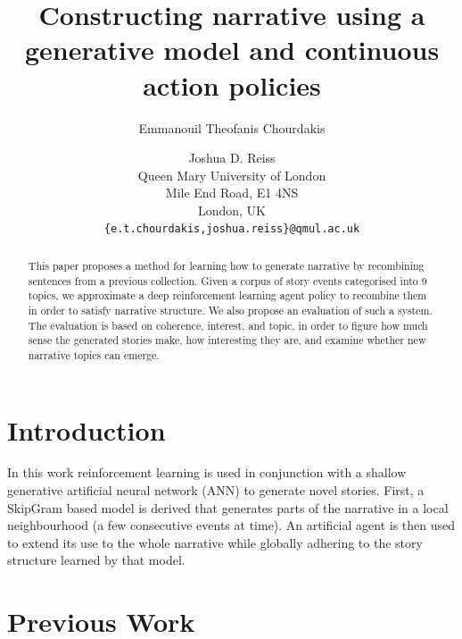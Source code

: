 \documentclass[11pt,letterpaper]{article}
\title{Constructing narrative using a generative model and continuous action policies}
\author{Emmanouil Theofanis Chourdakis \and Joshua D. Reiss\Thanks{Correspondence should be sent to the first author. This paper has been sponsored by RPPtv Ltd.}  \\Queen Mary University of London\\ Mile End Road, E1 4NS\\London, UK \\ \texttt{\{e.t.chourdakis,joshua.reiss\}@qmul.ac.uk}}
\date{}
\begin{document}
\maketitle

\begin{abstract}
This paper proposes a method for learning how to generate narrative by recombining sentences from a previous collection. Given a corpus of story events categorised into 9 topics, we approximate a deep reinforcement learning agent policy to recombine them in order to satisfy narrative structure. We also propose an evaluation of such a system. The evaluation is based on coherence, interest, and topic, in order to figure how much sense the generated stories make, how interesting they are, and examine whether new narrative topics can emerge.

\end{abstract}

\section{Introduction}

 In this work reinforcement learning is used in conjunction with a shallow generative artificial neural network (ANN) to generate novel stories. First, a SkipGram  \cite{mikolov2013efficient} based model is derived that generates parts of the narrative in a local neighbourhood (a few consecutive events at time). An artificial agent is then used to extend its use to the whole narrative while globally adhering to the story structure learned by that model.

\section{Previous Work}
\end{document}
